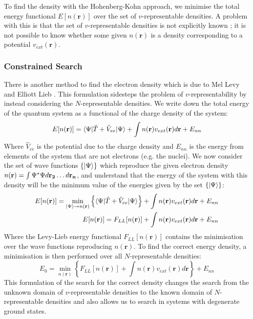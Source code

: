 \documentclass[12pt]{article}
\begin{document}
To find the density with the Hohenberg-Kohn approach, we minimise the total energy functional $E[n(\mathbf r)]$ over the set of $v$-representable densities. A problem with this is that the set of $v$-representable densities is not explicitly known \cite{GONIS201623}; it is not possible to know whether some given $n(\mathbf r)$ is a density corresponding to a potential $v_{ext}(\mathbf r)$.

\subsubsection{Constrained Search}
There is another method to find the electron density which is due to Mel Levy \cite{Levy6062} and Elliott Lieb \cite{lieb1985density}. This formulation sidesteps the problem of $v$-representability by instead considering the $N$-representable densities.
We write down the total energy of the quantum system as a functional of the charge density of the system:
\begin{equation}
	E[n(\mathbf r)] = \braket{\Psi|\hat T + \hat V_{ee}|\Psi} + \int n(\mathbf r)v_{ext}(\mathbf r)d\mathbf r + E_{nn}
\end{equation}
Where $\hat V_{ee}$ is the potential due to the charge density and $E_{nn}$ is the energy from elements of the system that are not electrons (e.g. the nuclei). 
We now consider the set of wave functions $\left\{\ket{\Psi}\right\}$ which reproduce the given electron density $n(\mathbf r)=\int \Psi^*\Psi d\mathbf{r_2}\mathellipsis d\mathbf{r_n}$, and understand that the energy of the system with this density will be the minimum value of the energies given by the set $\left\{\ket{\Psi}\right\}$:
\begin{equation}
\begin{split}
E[n(\mathbf r)] = \min_{\ket{\Psi} \rightarrow n(\mathbf r)}\left\{\braket{\Psi | \hat T + \hat V_{ee} | \Psi}\right\} + \int n(\mathbf r) v_{ext}(\mathbf r) d \mathbf r + E_{nn}\\
E[n(\mathbf r)] = F_{LL}[n(\mathbf r)] + \int n(\mathbf r) v_{ext}(\mathbf r) d\mathbf r + E_{nn}
\end{split}
\end{equation}
Where the Levy-Lieb energy functional $F_{LL}[n(\mathbf r)]$ contains the minimisation over the wave functions reproducing $n(\mathbf r)$.
To find the correct energy density, a minimisation is then performed over all $N$-representable densities:
\begin{equation}\label{eq:levylieb}
 E_0 = \min_{n(\mathbf r)} \left\{ F_{LL}[n(\mathbf r)] + \int n(\mathbf r) v_{ext}(\mathbf r) d \mathbf r\right\} + E_{nn}
\end{equation}
This formulation of the search for the correct density changes the search from the unknown domain of $v$-representable densities to the known domain of $N$-representable densities and also allows us to search in systems with degenerate ground states. 
\end{document}
